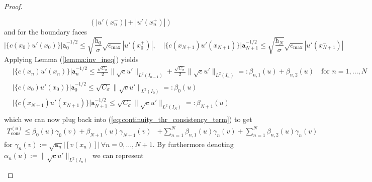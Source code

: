 \begin{proof}
\begin{proofstep}[Continuity]
\begin{equation}
            \left( |u'(x_n^-)| + |u'(x_n^+)| \right) \nonumber
        \end{equation}
        and for the boundary faces
        \begin{equation}
            \big|\{c(x_0)u'(x_0)\}\big|\texttt{a}_0^{-1/2} 
            \leq \sqrt{\frac{\texttt{h}_0}{\sigma}} \sqrt{c_{\max}}
            |u'(x_0^+)|, 
            \quad \big|\{c(x_{N+1})u'(x_{N+1})\}\big|\texttt{a}_{N+1}^{-1/2} 
            \leq \sqrt{\frac{\texttt{h}_{N}}{\sigma}} \sqrt{c_{\max}}
            |u'(x_{N+1}^-)| \nonumber
        \end{equation}
        Applying Lemma (\ref{lemma:inv_ineq}) yields
        \begin{align*}
            &\big|\{c(x_n)u'(x_n)\}\big|\texttt{a}_n^{-1/2} \leq \frac{\sqrt{C_{\sigma}}}{2}
            \|\sqrt{c}u'\|_{L^2(I_{n-1})} + \frac{\sqrt{C_{\sigma}}}{2}\|\sqrt{c}u'\|_{L^2(I_{n})}  
            =: \beta_{n,1}(u) + \beta_{n,2}(u) \quad \text{for } n=1,\ldots,N\\
            &\big|\{c(x_0)u'(x_0)\}\big|\texttt{a}_0^{-1/2} \leq \sqrt{C_{\sigma}}
            \|\sqrt{c}u'\|_{L^2(I_{0})} =:\beta_0(u)  \\
            &\big|\{c(x_{N+1})u'(x_{N+1})\}\big|\texttt{a}_{N+1}^{-1/2} \leq \sqrt{C_{\sigma}}
            \|\sqrt{c}u'\|_{L^2(I_{N})} =:\beta_{N+1}(u)  \\
        \end{align*}
        which we can now plug back into (\ref{eq:continuity_thr_consistency_term}) to get
        \begin{align}
            T_{\text{cons}}^{(u)} 
            \leq \beta_0(u)\gamma_0(v) + \beta_{N+1}(u)\gamma_{N+1}(v)
            &+ \sum_{n=1}^{N} \beta_{n,1}(u)\gamma_{n} (v)+ \sum_{n=1}^{N} \beta_{n,2}(u)\gamma_n(v)
        \end{align}
        for $\displaystyle \gamma_n(v) := \sqrt{\texttt{a}_n}\big|[v(x_n)]\big| \, \forall n=0,\ldots,N+1$.
        By furthermore denoting $ \alpha_n(u):= \|\sqrt{c}u'\|_{L^2(I_n)}$
        we can represent


\end{proofstep}
\end{proof}
